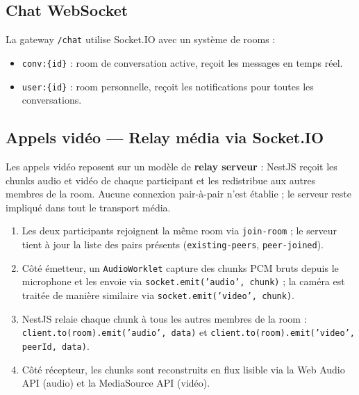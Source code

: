 ﻿\documentclass[12pt,a4paper]{report}
\begin{document}
\subsection{Chat WebSocket}

La gateway \texttt{/chat} utilise Socket.IO avec un système de rooms :
\begin{itemize}
  \item \texttt{conv:\{id\}} : room de conversation active, reçoit les messages en temps réel.
  \item \texttt{user:\{id\}} : room personnelle, reçoit les notifications pour toutes les conversations.
\end{itemize}

\subsection{Appels vidéo — Relay média via Socket.IO}

Les appels vidéo reposent sur un modèle de \textbf{relay serveur} : NestJS reçoit les chunks audio et vidéo de chaque participant et les redistribue aux autres membres de la room. Aucune connexion pair-à-pair n'est établie ; le serveur reste impliqué dans tout le transport média.

\begin{enumerate}
  \item Les deux participants rejoignent la même room via \texttt{join-room} ; le serveur tient à jour la liste des pairs présents (\texttt{existing-peers}, \texttt{peer-joined}).
  \item Côté émetteur, un \texttt{AudioWorklet} capture des chunks PCM bruts depuis le microphone et les envoie via \texttt{socket.emit('audio', chunk)} ; la caméra est traitée de manière similaire via \texttt{socket.emit('video', chunk)}.
  \item NestJS relaie chaque chunk à tous les autres membres de la room : \texttt{client.to(room).emit('audio', data)} et \texttt{client.to(room).emit('video', peerId, data)}.
  \item Côté récepteur, les chunks sont reconstruits en flux lisible via la Web Audio API (audio) et la MediaSource API (vidéo).
\end{enumerate}
\end{document}
